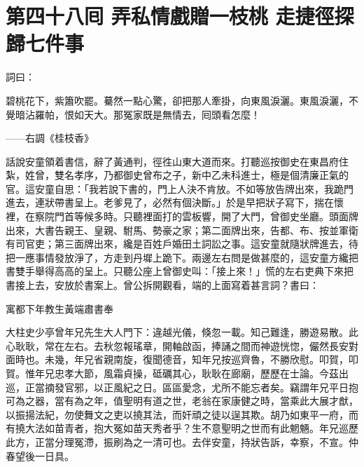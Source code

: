 
\chapter*{第四十八囘 弄私情戲贈一枝桃 走捷徑探歸七件事}


詞曰：

碧桃花下，紫簫吹罷。驀然一點心驚，卻把那人牽掛，向東風淚灑。東風淚灑，不覺暗沾羅帕，恨如天大。那冤家既是無情去，囘頭看怎麼！

——右調《桂枝香》

話說安童領着書信，辭了黃通判，徑徃山東大道而來。打聽巡按御史在東昌府住紮，姓曾，雙名孝序，乃都御史曾布之子，新中乙未科進士，極是個清廉正氣的官。這安童自思：「我若說下書的，門上人決不肯放。不如等放告牌出來，我跪門進去，連狀帶書呈上。老爹見了，必然有個決斷。」於是早把狀子寫下，揣在懷裡，在察院門首等候多時。只聽裡面打的雲板響，開了大門，曾御史坐廳。頭面牌出來，大書告親王、皇親、駙馬、勢豪之家；{}第二面牌出來，告都、布、按並軍衛有司官吏；第三面牌出來，纔是百姓戶婚田土詞訟之事。這安童就隨狀牌進去，待把一應事情發放淨了，方走到丹墀上跪下。兩邊左右問是做甚麼的，這安童方纔把書雙手舉得高高的呈上。只聽公座上曾御史叫：「接上來！」慌的左右吏典下來把書接上去，安放於書案上。曾公拆開觀看，端的上面寫着甚言詞？書曰：

寓都下年教生黃端肅書奉

大柱史少亭曾年兄先生大人門下：違越光儀，倏忽一載。知己難逢，勝遊易散。此心耿耿，常在左右。去秋忽報瑤章，開軸啟函，捧誦之間而神遊恍惚，儼然長安對面時也。未幾，年兄省親南旋，復聞德音，知年兄按巡齊魯，不勝欣慰。叩賀，叩賀。惟年兄忠孝大節，風霜貞操，砥礪其心，耿耿在廊廟，歷歷在士論。今茲出巡，正當摘發官邪，以正風紀之日。區區愛念，尤所不能忘者矣。竊謂年兄平日抱可為之器，當有為之年，值聖明有道之世，老翁在家康健之時，當乘此大展才猷，以振揚法紀，勿使舞文之吏以撓其法，而奸頑之徒以逞其欺。胡乃如東平一府，而有撓大法如苗青者，抱大冤如苗天秀者乎？生不意聖明之世而有此魍魎。年兄巡歷此方，正當分理冤滯，振刷為之一清可也。去伴安童，持狀告訴，幸察，不宣。仲春望後一日具。

